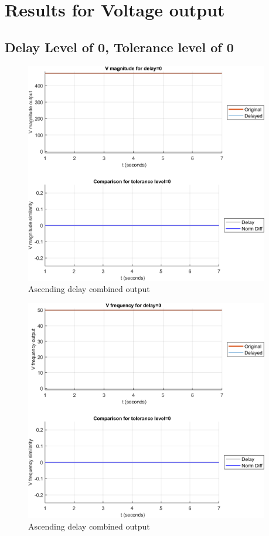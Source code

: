 \newpage
\section{Results for Voltage output}

\subsection{Delay Level of 0, Tolerance level of 0}
\begin{figure}[hb]
    \includegraphics[width=0.95\textwidth]{PMUsim-figures/DelayOf_0/Zero_vMagnitude_0.png}    
    \caption{Ascending delay combined output}
    \label{fig:PMUsim_Zero_vMagnitude_0}
\end{figure}

\begin{figure}[hb]
    \includegraphics[width=0.95\textwidth]{PMUsim-figures/DelayOf_0/Zero_vFrequency_0.png}    
    \caption{Ascending delay combined output}
    \label{fig:PMUsim_Zero_vFrequency_0}
\end{figure}

